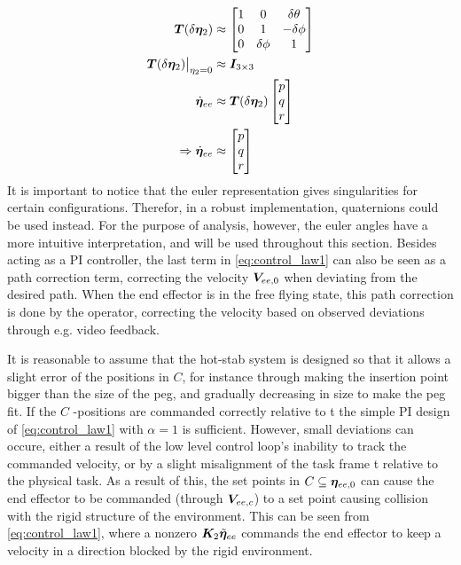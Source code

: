 \begin{align}
	\boldsymbol T(\delta \boldsymbol \eta_{2}) &\approx \begin{bmatrix} 1 & 0 & \delta \theta \\ 0 & 1 & -\delta \phi \\ 0 & \delta \phi & 1 \end{bmatrix}	
	\label{eq:linearized-transformation}
	\\
	\boldsymbol T(\delta \boldsymbol \eta_{2}) \big|_{\eta_{2}=0} &\approx \boldsymbol I_{3 \times 3}
	\label{eq:linearized-transformation2}
	\\
	\dot{\boldsymbol \eta}_{ee}&\approx\boldsymbol T(\delta \boldsymbol \eta_{2}) \begin{bmatrix} p \\ q \\ r\end{bmatrix}
	\\
	\Rightarrow \dot{\boldsymbol \eta}_{ee}&\approx \begin{bmatrix} p \\ q\\  r\end{bmatrix}
\end{align}
It is important to notice that the euler representation gives singularities for certain configurations. Therefor, in a robust implementation, quaternions could be used instead. For the purpose of analysis, however, the euler angles have a more intuitive interpretation, and will be used throughout this section.
Besides acting as a PI controller, the last term in \eqref{eq:control_law1} can also be seen as a path correction term, correcting the velocity $\boldsymbol V_{ee,0}$ when deviating from the desired path. When the end effector is in the free flying state, this path correction is done by the operator, correcting the velocity based on observed deviations through e.g. video feedback. 

It is reasonable to assume that the hot-stab system is designed so that it allows a slight error of the positions in $C$, for instance through making the insertion point bigger than the size of the peg, and gradually decreasing in size to make the peg fit. If the $C$ -positions are commanded correctly relative to \frame t the simple PI design of \ref{eq:control_law1} with $\alpha=1$ is sufficient. However, small deviations can occure, either a result of the low level control loop's inability to track the commanded velocity, or by a slight misalignment of the task frame \frame t relative to the physical task. As a result of this, the set points in $C \subseteq \boldsymbol \eta_{ee,0}$ can cause the end effector to be commanded (through $\boldsymbol V_{ee,c}$) to a set point causing collision with the rigid structure of the environment. This can be seen from \eqref{eq:control_law1}, where a nonzero $\boldsymbol K_{2}\tilde{\boldsymbol \eta}_{ee}$ commands the end effector to keep a velocity in a direction blocked by the rigid environment.

